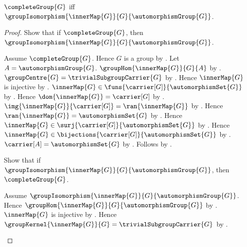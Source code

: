 \begin{theorem}\label{complete_group_iff_inner_map_isomorphism}
    $\completeGroup{G}$ iff
        $\groupIsomorphism
            {\innerMap{G}}
            {G}
            {\automorphismGroup{G}}$.
\end{theorem}
\begin{proof}
    Show that if $\completeGroup{G}$, then
        $\groupIsomorphism
            {\innerMap{G}}
            {G}
            {\automorphismGroup{G}}$.
    \begin{subproof}
        Assume $\completeGroup{G}$.
        Hence $G$ is a group by .
        Let $A=\automorphismGroup{G}$.
        $\groupHom{\innerMap{G}}{G}{A}$ by
            .
        $\groupCentre{G}=\trivialSubgroupCarrier{G}$ by
            .
        Hence $\innerMap{G}$ is injective by
            .
        $\innerMap{G}\in\funs{\carrier[G]}{\automorphismSet{G}}$ by
            .
        Hence $\dom{\innerMap{G}}=\carrier[G]$ by
            .
        $\img{\innerMap{G}}{\carrier[G]}=
            \ran{\innerMap{G}}$ by .
        Hence $\ran{\innerMap{G}}=\automorphismSet{G}$ by
            .
        Hence $\innerMap{G}\in
            \surj{\carrier[G]}{\automorphismSet{G}}$ by
            .
        Hence $\innerMap{G}\in
            \bijections{\carrier[G]}{\automorphismSet{G}}$ by
            .
        $\carrier[A]=\automorphismSet{G}$ by
            .
        Follows by .
    \end{subproof}
    Show that if
        $\groupIsomorphism
            {\innerMap{G}}
            {G}
            {\automorphismGroup{G}}$, then
        $\completeGroup{G}$.
    \begin{subproof}
        Assume
            $\groupIsomorphism
                {\innerMap{G}}
                {G}
                {\automorphismGroup{G}}$.
        Hence $\groupHom{\innerMap{G}}{G}{\automorphismGroup{G}}$ by
            .
        $\innerMap{G}$ is injective by
            .
        Hence
            $\groupKernel{\innerMap{G}}{G}
                =\trivialSubgroupCarrier{G}$ by
            .

\end{subproof}
\end{proof}
